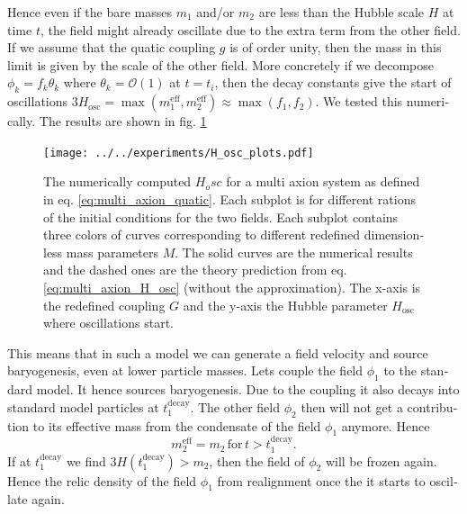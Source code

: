 \documentclass[master,       %
               twoside,        %
               BCOR10mm,       %
               english,ngerman, %
               ]{GAUBM}
\begin{document}
\begin{otherlanguage}{english}
Hence even if the bare masses $m_1$ and/or $m_2$ are less than the Hubble scale $H$ at time $t$, the field might already oscillate due to the extra term from the other field. If we assume that the quatic coupling $g$ is of order unity, then the mass in this limit is given by the scale of the other field.
More concretely if we decompose $\phi_k = f_k \theta_k$ where $\theta_k = \mathcal{O}(1)$ at $t = t_i$, then
the decay constants give the start of oscillations
$3 H_\mathrm{osc} = \max(m_1^\mathrm{eff}, m_2^\mathrm{eff}) \approx \max(f_1, f_2)$.
We tested this numerically. The results are shown in fig. \ref{fig:multi_axion_quatic_H_osc}
\begin{figure}[H]
	\texttt{[image: ../../experiments/H\_osc\_plots.pdf]}
	\caption{The numerically computed $H_osc$ for a multi axion system as defined in eq. \eqref{eq:multi_axion_quatic}. Each subplot is for different rations of the initial conditions for the two fields. Each subplot contains three colors of curves corresponding to different redefined dimensionless mass parameters $M$. The solid curves are the numerical results and the dashed ones are the theory prediction from eq. \eqref{eq:multi_axion_H_osc} (without the approximation). The x-axis is the redefined coupling $G$ and the y-axis the Hubble parameter $H_\mathrm{osc}$ where oscillations start.}
	\label{fig:multi_axion_quatic_H_osc}
\end{figure}

This means that in such a model we can generate a field velocity and source baryogenesis, even at lower particle masses. Lets couple the field $\phi_1$ to the standard model.
It hence sources baryogenesis. Due to the coupling it also decays into standard model particles at $t_1^\mathrm{decay}$.
The other field $\phi_2$ then will not get a contribution to its effective mass from the condensate of the field $\phi_1$ anymore. Hence
\begin{equation}
	m_2^\mathrm{eff} = m_2 \, \mathrm{for} \, t > t_1^\mathrm{decay}.
\end{equation}
If at $t_1^\mathrm{decay}$ we find $3 H(t_1^\mathrm{decay}) > m_2$, then the field of $\phi_2$ will be frozen again.
Hence the relic density of the field $\phi_1$ from realignment once the it starts to oscillate again.


\end{otherlanguage}
\end{document}
